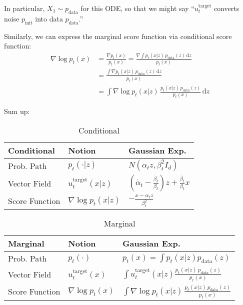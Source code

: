 In particular, $X_1 \sim p_{\text{data}}$ for this ODE, so that we might say 
``$u_t^{\text{target}}$ converts noise $p_{\text{init}}$ into data $p_{\text{data}}$.''

Similarly, we can express the marginal score function via conditional score function:
\begin{equation}
    \begin{aligned}
    \nabla \log p_t(x) &
    = \frac{\nabla p_t(x)}{p_t(x)} 
    = \frac{\nabla \int p_t(x|z)\, p_{\text{data}}(z)\, \mathrm{d}z}{p_t(x)} \\
    & = \frac{\int \nabla p_t(x|z)\, p_{\text{data}}(z)\, \mathrm{d}z}{p_t(x)} \\
    & = \int \nabla \log p_t(x|z)\, \frac{p_t(x|z)\, p_{\text{data}}(z)}{p_t(x)}\, \mathrm{d}z
    \end{aligned}
\end{equation}

Sum up:
\begin{table}[ht]
    \centering
    \begin{tabularx}{\textwidth}{|X|X|X|}
    \hline
    Conditional  & Notion & Gaussian Exp. \\ \hline
    Prob. Path & $p_t(\cdot|z)$ & $N(\alpha_t z, \beta_t^2 I_d)$ \\ \hline
    Vector Field & $u_t^{\text{target}}(x|z)$ & $(\dot{\alpha_t}-\frac{\dot{\beta_t}}{\beta_t})z+\frac{\dot{\beta_t}}{\beta_t}x$ \\ \hline
    Score Function & $\nabla \log p_t(x|z)$ & $-\frac{x-\alpha_t z}{\beta_t^2}$ \\ \hline
    \end{tabularx}
    \caption{Conditional}
\end{table}

\begin{table}[ht]
    \centering
    \begin{tabularx}{\textwidth}{|X|X|X|}
    \hline
    Marginal  & Notion & Gaussian Exp. \\ \hline
    Prob. Path & $p_t(\cdot)$ & $p_t(x) = \int p_t(x|z) p_{\text{data}}(z)$ \\ \hline
    Vector Field & $u_t^{\text{target}}(x)$ & $ \int u_t^{\text{target}}(x | z) \frac{p_t(x | z) \, p_{\text{data}}(z)}{p_t(x)}$ \\ \hline
    Score Function & $\nabla \log p_t(x)$ & $\int \nabla \log p_t(x|z)\, \frac{p_t(x|z)\, p_{\text{data}}(z)}{p_t(x)}$ \\ \hline
    \end{tabularx}
    \caption{Marginal}
\end{table}

